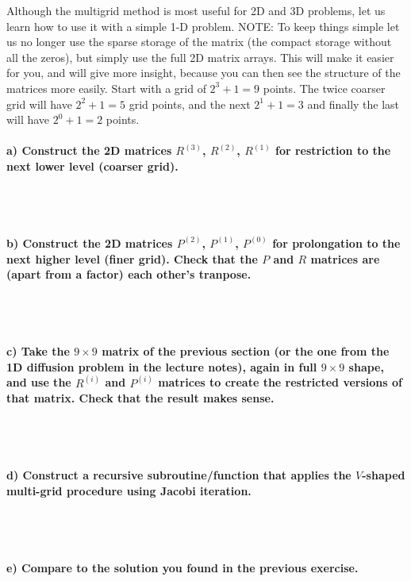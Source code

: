 Although the multigrid method is most useful for 2D and 3D problems, 
let us learn how to use it with a simple 1-D problem.
NOTE: To keep things simple let us no longer use the sparse storage of 
the matrix (the compact storage without all the zeros), but simply use 
the full 2D matrix arrays. This will make it easier for you, and will 
give more insight, because you can then see the structure of the 
matrices more easily.
Start with a grid of $2^3+1=9$ points. The twice coarser grid will have 
$2^2+1=5$ grid points, and the next $2^1+1=3$ and finally the last will 
have $2^0+1=2$ points.

\paragraph{
    a) Construct the 2D matrices $R^{(3)}$, $R^{(2)}$, $R^{(1)}$ for 
    restriction to the next lower level (coarser grid).
} \ \\
    \\

\paragraph{
    b) Construct the 2D matrices $P^{(2)}$, $P^{(1)}$, $P^{(0)}$ for 
    prolongation to the next higher level (finer grid). Check that 
    the $P$ and $R$ matrices are (apart from a factor) each other’s 
    tranpose.
} \ \\
    \\

\paragraph{
    c) Take the $9\times9$ matrix of the previous section (or the one 
    from the 1D diffusion problem in the lecture notes), again in full 
    $9\times9$ shape, and use the $R^{(i)}$ and $P^{(i)}$ matrices to 
    create the restricted versions of that matrix. 
    Check that the result makes sense.
} \ \\
    \\

\paragraph{
    d) Construct a recursive subroutine/function that applies the 
    $V$-shaped multi-grid procedure using Jacobi iteration.
} \ \\
    \\

\paragraph{
    e) Compare to the solution you found in the previous exercise.
} \ \\
    \\

